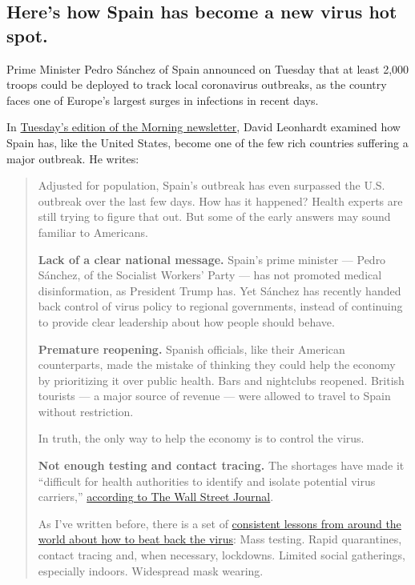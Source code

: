 \hypertarget{heres-how-spain-has-become-a-new-virus-hot-spot}{%
\subsection{Here's how Spain has become a new virus hot
spot.}\label{heres-how-spain-has-become-a-new-virus-hot-spot}}

Prime Minister Pedro Sánchez of Spain announced on Tuesday that at least
2,000 troops could be deployed to track local coronavirus outbreaks, as
the country faces one of Europe's largest surges in infections in recent
days.

In
\href{https://www.nytimes3xbfgragh.onion/2020/08/25/briefing/republican-convention-wisconsin-jerry-falwell-your-tuesday-briefing.html}{Tuesday's
edition of the Morning newsletter}, David Leonhardt examined how Spain
has, like the United States, become one of the few rich countries
suffering a major outbreak. He writes:

\begin{quote}
Adjusted for population, Spain's outbreak has even surpassed the U.S.
outbreak over the last few days. How has it happened? Health experts are
still trying to figure that out. But some of the early answers may sound
familiar to Americans.

\textbf{Lack of a clear national message.} Spain's prime minister ---
Pedro Sánchez, of the Socialist Workers' Party --- has not promoted
medical disinformation, as President Trump has. Yet Sánchez has recently
handed back control of virus policy to regional governments, instead of
continuing to provide clear leadership about how people should behave.

\textbf{Premature reopening.} Spanish officials, like their American
counterparts, made the mistake of thinking they could help the economy
by prioritizing it over public health. Bars and nightclubs reopened.
British tourists --- a major source of revenue --- were allowed to
travel to Spain without restriction.

In truth, the only way to help the economy is to control the virus.

\textbf{Not enough testing and contact tracing.} The shortages have made
it ``difficult for health authorities to identify and isolate potential
virus carriers,''
\href{https://www.wsj.com/articles/spain-caught-off-guard-by-resurgent-coronavirus-11598194801}{according
to The Wall Street Journal}.

As I've written before, there is a set of
\href{https://www.nytimes3xbfgragh.onion/2020/08/06/us/coronavirus-us.html}{consistent
lessons from around the world about how to beat back the virus}: Mass
testing. Rapid quarantines, contact tracing and, when necessary,
lockdowns. Limited social gatherings, especially indoors. Widespread
mask wearing.
\end{quote}


